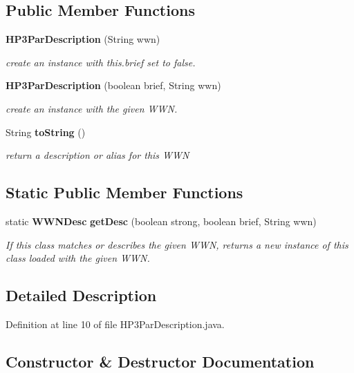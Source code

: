 \subsection*{Public Member Functions}
\begin{DoxyCompactItemize}
\item 
{\bf H\-P3\-Par\-Description} (String wwn)
\begin{DoxyCompactList}\small\item\em create an instance with this.\-brief set to false. \end{DoxyCompactList}\item 
{\bf H\-P3\-Par\-Description} (boolean brief, String wwn)
\begin{DoxyCompactList}\small\item\em create an instance with the given W\-W\-N. \end{DoxyCompactList}\item 
String {\bf to\-String} ()
\begin{DoxyCompactList}\small\item\em return a description or alias for this W\-W\-N \end{DoxyCompactList}\end{DoxyCompactItemize}
\subsection*{Static Public Member Functions}
\begin{DoxyCompactItemize}
\item 
static {\bf W\-W\-N\-Desc} {\bf get\-Desc} (boolean strong, boolean brief, String wwn)
\begin{DoxyCompactList}\small\item\em If this class matches or describes the given W\-W\-N, returns a new instance of this class loaded with the given W\-W\-N. \end{DoxyCompactList}\end{DoxyCompactItemize}


\subsection{Detailed Description}


Definition at line 10 of file H\-P3\-Par\-Description.\-java.



\subsection{Constructor \& Destructor Documentation}
